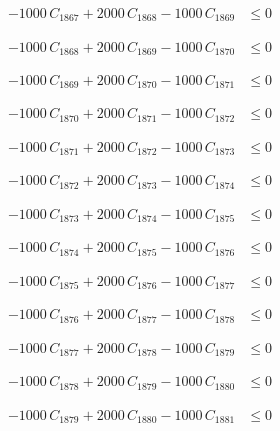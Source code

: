 \documentclass[a4paper,11pt]{article}
\begin{document}
\begin{align}
-1000\,C_{1867} + 2000\,C_{1868} - 1000\,C_{1869} &\leq 0 \nonumber
\end{align}

\begin{align}
-1000\,C_{1868} + 2000\,C_{1869} - 1000\,C_{1870} &\leq 0 \nonumber
\end{align}

\begin{align}
-1000\,C_{1869} + 2000\,C_{1870} - 1000\,C_{1871} &\leq 0 \nonumber
\end{align}

\begin{align}
-1000\,C_{1870} + 2000\,C_{1871} - 1000\,C_{1872} &\leq 0 \nonumber
\end{align}

\begin{align}
-1000\,C_{1871} + 2000\,C_{1872} - 1000\,C_{1873} &\leq 0 \nonumber
\end{align}

\begin{align}
-1000\,C_{1872} + 2000\,C_{1873} - 1000\,C_{1874} &\leq 0 \nonumber
\end{align}

\begin{align}
-1000\,C_{1873} + 2000\,C_{1874} - 1000\,C_{1875} &\leq 0 \nonumber
\end{align}

\begin{align}
-1000\,C_{1874} + 2000\,C_{1875} - 1000\,C_{1876} &\leq 0 \nonumber
\end{align}

\begin{align}
-1000\,C_{1875} + 2000\,C_{1876} - 1000\,C_{1877} &\leq 0 \nonumber
\end{align}

\begin{align}
-1000\,C_{1876} + 2000\,C_{1877} - 1000\,C_{1878} &\leq 0 \nonumber
\end{align}

\begin{align}
-1000\,C_{1877} + 2000\,C_{1878} - 1000\,C_{1879} &\leq 0 \nonumber
\end{align}

\begin{align}
-1000\,C_{1878} + 2000\,C_{1879} - 1000\,C_{1880} &\leq 0 \nonumber
\end{align}

\begin{align}
-1000\,C_{1879} + 2000\,C_{1880} - 1000\,C_{1881} &\leq 0 \nonumber
\end{align}
\end{document}
